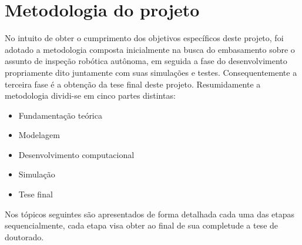 \chapter{Metodologia do projeto}
No intuito de obter o cumprimento dos objetivos específicos deste projeto, foi adotado a metodologia composta inicialmente na busca do embasamento sobre o assunto de inspeção robótica autônoma, em seguida a fase do desenvolvimento propriamente dito juntamente com suas simulações e testes. Consequentemente a terceira fase é a obtenção da tese final deste projeto. Resumidamente a metodologia dividi-se em cinco partes distintas:
\begin{itemize}
\item Fundamentação teórica
\item Modelagem
\item Desenvolvimento computacional
\item Simulação
\item Tese final
\end{itemize}
Nos tópicos seguintes são apresentados de forma detalhada cada uma das etapas sequencialmente, cada etapa visa obter ao final de sua completude a tese de doutorado.

\setcounter{equation}{0}
